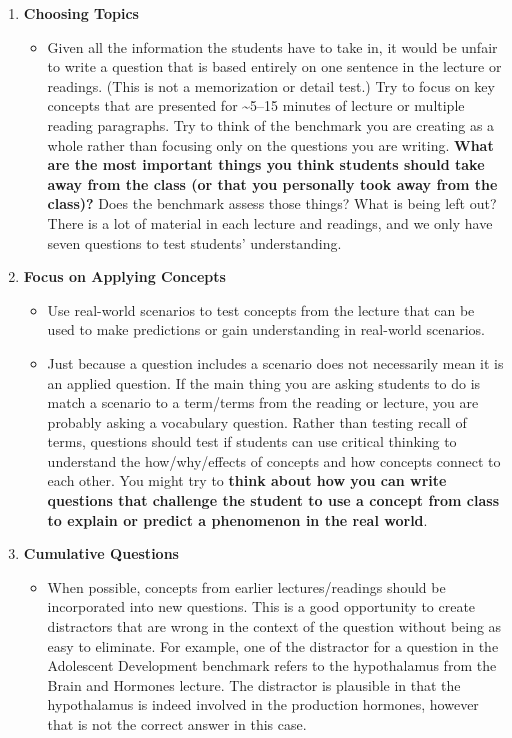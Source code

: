 \documentclass[
]{article}
\providecommand{\tightlist}{%
  \setlength{\itemsep}{0pt}\setlength{\parskip}{0pt}}
\begin{document}
\begin{enumerate}
\def\labelenumi{\arabic{enumi}.}
\tightlist
\item
  \textbf{Choosing Topics}

  \begin{itemize}
  \tightlist
  \item
    Given all the information the students have to take in, it would be unfair to write a question that is based entirely on one sentence in the lecture or readings. (This is not a memorization or detail test.) Try to focus on key concepts that are presented for \textasciitilde5--15 minutes of lecture or multiple reading paragraphs. Try to think of the benchmark you are creating as a whole rather than focusing only on the questions you are writing. \textbf{What are the most important things you think students should take away from the class (or that you personally took away from the class)?} Does the benchmark assess those things? What is being left out? There is a lot of material in each lecture and readings, and we only have seven questions to test students' understanding.
  \end{itemize}
\item
  \textbf{Focus on Applying Concepts}

  \begin{itemize}
  \tightlist
  \item
    Use real-world scenarios to test concepts from the lecture that can be used to make predictions or gain understanding in real-world scenarios.
  \item
    Just because a question includes a scenario does not necessarily mean it is an applied question. If the main thing you are asking students to do is match a scenario to a term/terms from the reading or lecture, you are probably asking a vocabulary question. Rather than testing recall of terms, questions should test if students can use critical thinking to understand the how/why/effects of concepts and how concepts connect to each other. You might try to \textbf{think about how you can write questions that challenge the student to use a concept from class to explain or predict a phenomenon in the real world}.
  \end{itemize}
\item
  \textbf{Cumulative Questions}

  \begin{itemize}
  \tightlist
  \item
    When possible, concepts from earlier lectures/readings should be incorporated into new questions. This is a good opportunity to create distractors that are wrong in the context of the question without being as easy to eliminate. For example, one of the distractor for a question in the Adolescent Development benchmark refers to the hypothalamus from the Brain and Hormones lecture. The distractor is plausible in that the hypothalamus is indeed involved in the production hormones, however that is not the correct answer in this case.
  \end{itemize}
\end{enumerate}
\end{document}
